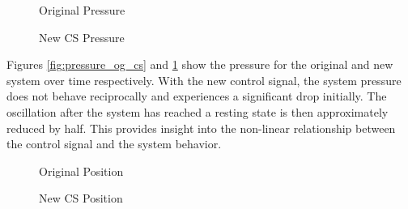 \begin{figure}[H] \label{ fig-pressure-mod} 
  \begin{minipage}[b]{0.5\linewidth}
    \caption{Original Pressure}
    \label{fig:pressure_og_cs}
  \end{minipage} 
  \begin{minipage}[b]{0.5\linewidth}
    \caption{New CS Pressure }
    \label{fig:pressure_new_cs}
  \end{minipage} 
\end{figure}

Figures \ref{fig:pressure_og_cs} and \ref{fig:pressure_new_cs} show the pressure for the original and new system over time respectively. With the new control signal, the system pressure does not behave reciprocally and experiences a significant drop initially. The oscillation after the system has reached a resting state is then approximately reduced by half. This provides insight into the non-linear relationship between the control signal and the system behavior.

\begin{figure}[H] \label{ fig-pos-mod} 
  \begin{minipage}[b]{0.5\linewidth}
    \caption{Original Position}
    \label{fig:pos_og_cs}
  \end{minipage} 
  \begin{minipage}[b]{0.5\linewidth}
    \caption{New CS Position}
    \label{fig:pos_new_cs}
  \end{minipage} 
\end{figure}

